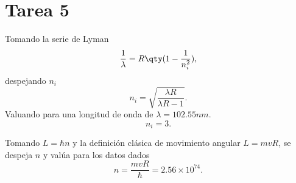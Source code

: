 \section*{Tarea 5}
\begin{mdframed}[style=warning]
	\begin{ejercicio}
		Tomando la serie de Lyman
			$$ \frac{1}{\lambda} = R\qty(1 - \frac{1}{n_i ^2}), $$
			despejando $n_i$
			$$ \boxed{n_i = \sqrt{\frac{\lambda R}{\lambda R - 1}}. } $$
		Valuando para una longitud de onda de $\lambda = 102.55nm$.
			$$ \boxed{ n_i = 3. } $$
	\end{ejercicio}
\end{mdframed}


\begin{mdframed}[style=warning]
	\begin{ejercicio}
		Tomando $L = \hbar n$ y la definición clásica de movimiento angular $L = mvR$, se despeja $n$ y valúa para los datos dados
			$$ \boxed{ n = \frac{mvR}{\hbar} = 2.56\times 10^{74}. } $$
	\end{ejercicio}
\end{mdframed}
